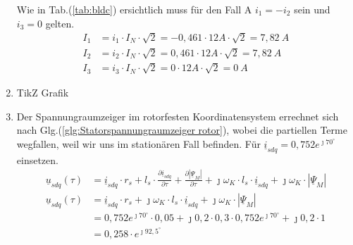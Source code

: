 \begin{solution}
\begin{enumerate}
Wie in Tab.(\ref{tab:bldc}) ersichtlich muss für den Fall A $i_1= -i_2$ sein und $i_3= 0$ gelten.
\begin{align}
I_1 & = i_1 \cdot I_N \cdot \sqrt{2} = -0,461 \cdot 12 A \cdot \sqrt{2} =7,82~A \\
I_2 & = i_2 \cdot I_N \cdot \sqrt{2} = 0,461 \cdot 12 A \cdot \sqrt{2} =7,82~A \\
I_3 & = i_3 \cdot I_N \cdot \sqrt{2} =0 \cdot 12 A \cdot \sqrt{2} =0~A
\end{align}
\item TikZ Grafik
\item Der Spannungraumzeiger im rotorfesten Koordinatensystem errechnet sich nach Glg.(\ref{glg:Statorspannungraumzeiger rotor}), wobei die partiellen Terme wegfallen, weil wir uns im stationären Fall befinden. Für $\underline{i}_{sdq}= 0,752 e^{\jmath 70^\circ}$ einsetzen.
\begin{align}
\underline{u}_{sdq}(\tau) &= \underline{i}_{sdq} \cdot r_s + l_s \cdot \frac{\partial \underline{i}_{sdq}}{\partial \tau} + \frac{\partial |\underline{\Psi}_M|}{\partial \tau} + \jmath \omega_K \cdot l_s \cdot \underline{i}_{sdq} + \jmath \omega_K \cdot |\underline{\Psi}_M|\\
\underline{u}_{sdq}(\tau) &= \underline{i}_{sdq} \cdot r_s + \jmath \omega_K \cdot l_s \cdot \underline{i}_{sdq} + \jmath \omega_K \cdot |\underline{\Psi}_M|\\
&= 0,752 e^{\jmath 70^\circ} \cdot 0,05 + \jmath 0,2 \cdot 0,3 \cdot 0,752 e^{\jmath 70^\circ}+\jmath 0,2 \cdot 1\\
&=0,258 \cdot e^{\jmath 92,5^\circ}
\end{align}
\end{enumerate}
\end{solution}